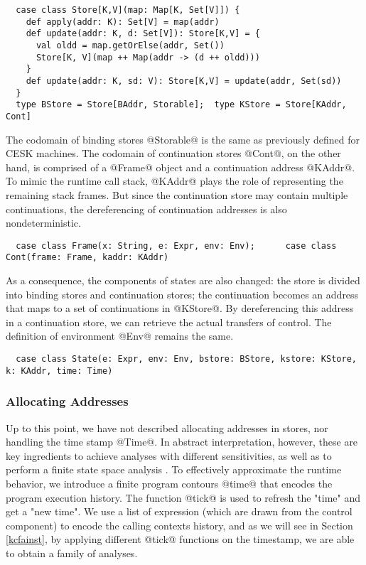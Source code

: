 \documentclass[acmsmall, review]{acmart}\settopmatter{}
\begin{document}
\begin{lstlisting}
  case class Store[K,V](map: Map[K, Set[V]]) {
    def apply(addr: K): Set[V] = map(addr)
    def update(addr: K, d: Set[V]): Store[K,V] = {
      val oldd = map.getOrElse(addr, Set())
      Store[K, V](map ++ Map(addr -> (d ++ oldd)))
    }
    def update(addr: K, sd: V): Store[K,V] = update(addr, Set(sd))
  }
  type BStore = Store[BAddr, Storable];  type KStore = Store[KAddr, Cont]
\end{lstlisting}

The codomain of binding stores @Storable@ is the same as previously defined for CESK 
machines. The codomain of continuation stores @Cont@, on the other hand, is comprised of
a @Frame@ object and a continuation address @KAddr@. To mimic the runtime call stack, 
@KAddr@ plays the role of representing the remaining stack frames.
But since the continuation store may contain multiple continuations, the dereferencing 
of continuation addresses is also nondeterministic.

\begin{lstlisting}
  case class Frame(x: String, e: Expr, env: Env);      case class Cont(frame: Frame, kaddr: KAddr)
\end{lstlisting}

As a consequence, the components of states are also changed: the store is divided
into binding stores and continuation stores; the continuation becomes an address
that maps to a set of continuations in @KStore@.
By dereferencing this address in a continuation store, we can retrieve the actual 
transfers of control. The definition of environment @Env@ remains the same.

\begin{lstlisting}
  case class State(e: Expr, env: Env, bstore: BStore, kstore: KStore, k: KAddr, time: Time)
\end{lstlisting}

\subsubsection{Allocating Addresses}
Up to this point, we have not described allocating addresses in stores, nor handling
the time stamp @Time@. In abstract interpretation, however, these are key ingredients
to achieve analyses with different sensitivities, as well as to perform a finite
state space analysis \cite{Gilray:2016:ACP:2951913.2951936}.
To effectively approximate the runtime behavior, we introduce a finite program contours
@time@ that encodes the program execution history. The function @tick@ is used to refresh
the "time" and get a "new time". We use a list of expression (which are drawn from the
control component) to encode the calling contexts history, and as we will see in Section~
\ref{kcfainst}, by applying different @tick@ functions on the timestamp, we are able to
obtain a family of analyses.
\end{document}
